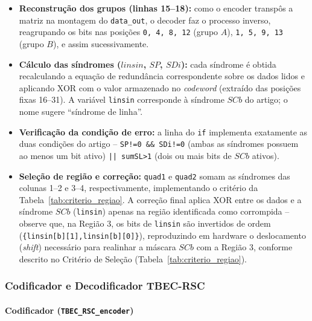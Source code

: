 \documentclass[12pt,a4paper]{article}
\begin{document}
\begin{itemize}
    \item \textbf{Reconstrução dos grupos (linhas 15–18):} como o encoder 
    transpôs a matriz na montagem do \texttt{data\_out}, o decoder faz o 
    processo inverso, reagrupando os bits nas posições \texttt{0, 4, 8, 12} 
    (grupo $A$), \texttt{1, 5, 9, 13} (grupo $B$), e assim sucessivamente.
    
    \item \textbf{Cálculo das síndromes ($linsin$, $SP$, $SDi$):} cada síndrome 
    é obtida recalculando a equação de redundância correspondente sobre os 
    dados lidos e aplicando XOR com o valor armazenado no \textit{codeword} 
    (extraído das posições fixas 16--31). A variável \texttt{linsin} 
    corresponde à síndrome $SCb$ do artigo; o nome sugere ``síndrome de 
    linha''.
    
    \item \textbf{Verificação da condição de erro:} a linha do \texttt{if} 
    implementa exatamente as duas condições do artigo -- \texttt{SP!=0 \&\& 
    SDi!=0} (ambas as síndromes possuem ao menos um bit ativo) \texttt{|| 
    sumSL>1} (dois ou mais bits de $SCb$ ativos).
    
    \item \textbf{Seleção de região e correção:} \texttt{quad1} e 
    \texttt{quad2} somam as síndromes das colunas 1--2 e 3--4, 
    respectivamente, implementando o critério da Tabela~\ref{tab:criterio_regiao}. 
    A correção final aplica XOR entre os dados e a síndrome $SCb$ 
    (\texttt{linsin}) apenas na região identificada como corrompida -- 
    observe que, na Região 3, os bits de \texttt{linsin} são invertidos de 
    ordem (\texttt{\{linsin[b][1],linsin[b][0]\}}), reproduzindo em hardware 
    o deslocamento (\textit{shift}) necessário para realinhar a máscara $SCb$ 
    com a Região 3, conforme descrito no Critério de Seleção 
    (Tabela~\ref{tab:criterio_regiao}).
\end{itemize}

\subsubsection{Codificador e Decodificador TBEC-RSC}

\paragraph{Codificador (\texttt{TBEC\_RSC\_encoder})}
\end{document}
